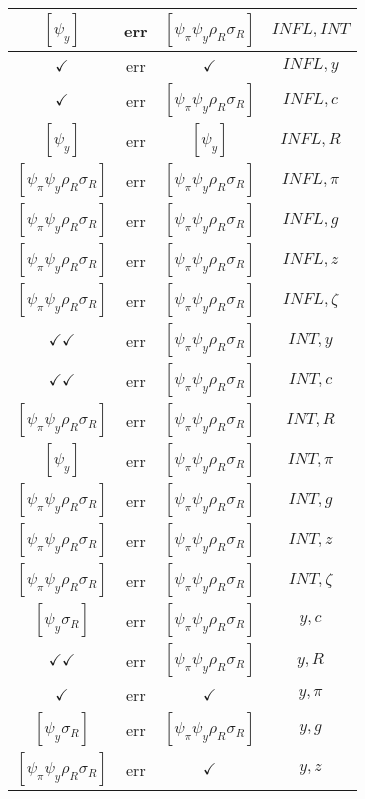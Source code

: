 \documentclass[a4paper,10pt]{article}
\begin{document}
\begin{longtable}{|c|c|c|c|}
\hline
$[\psi_y ]$ & err & $[\psi_\pi \psi_y \rho_R \sigma_R ]$ & ${INFL},{INT}$ \\
\hline
$\checkmark$ & err & $\checkmark$ & ${INFL},{y}$ \\
\hline
$\checkmark$ & err & $[\psi_\pi \psi_y \rho_R \sigma_R ]$ & ${INFL},{c}$ \\
\hline
$[\psi_y ]$ & err & $[\psi_y ]$ & ${INFL},{R}$ \\
\hline
$[\psi_\pi \psi_y \rho_R \sigma_R ]$ & err & $[\psi_\pi \psi_y \rho_R \sigma_R ]$ & ${INFL},{\pi}$ \\
\hline
$[\psi_\pi \psi_y \rho_R \sigma_R ]$ & err & $[\psi_\pi \psi_y \rho_R \sigma_R ]$ & ${INFL},{g}$ \\
\hline
$[\psi_\pi \psi_y \rho_R \sigma_R ]$ & err & $[\psi_\pi \psi_y \rho_R \sigma_R ]$ & ${INFL},{z}$ \\
\hline
$[\psi_\pi \psi_y \rho_R \sigma_R ]$ & err & $[\psi_\pi \psi_y \rho_R \sigma_R ]$ & ${INFL},{\zeta}$ \\
\hline
$\checkmark\checkmark$ & err & $[\psi_\pi \psi_y \rho_R \sigma_R ]$ & ${INT},{y}$ \\
\hline
$\checkmark\checkmark$ & err & $[\psi_\pi \psi_y \rho_R \sigma_R ]$ & ${INT},{c}$ \\
\hline
$[\psi_\pi \psi_y \rho_R \sigma_R ]$ & err & $[\psi_\pi \psi_y \rho_R \sigma_R ]$ & ${INT},{R}$ \\
\hline
$[\psi_y ]$ & err & $[\psi_\pi \psi_y \rho_R \sigma_R ]$ & ${INT},{\pi}$ \\
\hline
$[\psi_\pi \psi_y \rho_R \sigma_R ]$ & err & $[\psi_\pi \psi_y \rho_R \sigma_R ]$ & ${INT},{g}$ \\
\hline
$[\psi_\pi \psi_y \rho_R \sigma_R ]$ & err & $[\psi_\pi \psi_y \rho_R \sigma_R ]$ & ${INT},{z}$ \\
\hline
$[\psi_\pi \psi_y \rho_R \sigma_R ]$ & err & $[\psi_\pi \psi_y \rho_R \sigma_R ]$ & ${INT},{\zeta}$ \\
\hline
$[\psi_y \sigma_R ]$ & err & $[\psi_\pi \psi_y \rho_R \sigma_R ]$ & ${y},{c}$ \\
\hline
$\checkmark\checkmark$ & err & $[\psi_\pi \psi_y \rho_R \sigma_R ]$ & ${y},{R}$ \\
\hline
$\checkmark$ & err & $\checkmark$ & ${y},{\pi}$ \\
\hline
$[\psi_y \sigma_R ]$ & err & $[\psi_\pi \psi_y \rho_R \sigma_R ]$ & ${y},{g}$ \\
\hline
$[\psi_\pi \psi_y \rho_R \sigma_R ]$ & err & $\checkmark$ & ${y},{z}$ \\

\end{longtable}
\end{document}
